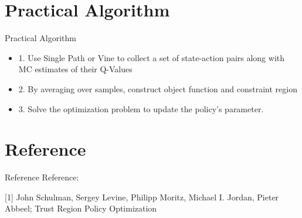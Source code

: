 \documentclass[mathserif]{beamer}
\begin{document}
\section{Practical Algorithm}
\begin{frame}[t]{Practical Algorithm}
\begin{itemize}
  \item 1. Use Single Path or Vine to collect a set of state-action pairs along with MC estimates of their Q-Values
  \item 2. By averaging over samples, construct object function and constraint region
  \item 3. Solve the optimization problem to update the policy's parameter.
\end{itemize}
\end{frame}

\section{Reference}
\begin{frame}{Reference}
  Reference:

  [1] John Schulman, Sergey Levine, Philipp Moritz, Michael I. Jordan, Pieter Abbeel; Trust Region Policy Optimization
\end{frame}
\end{document}
